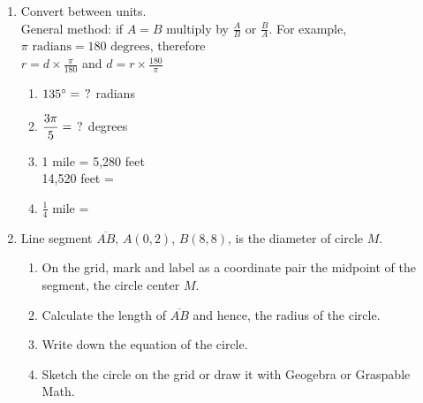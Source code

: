 \documentclass[12pt, twoside]{article}
\begin{document}
\begin{enumerate}
\newpage
\item Convert between units. \\[0.25cm]
General method: if $A = B$ multiply by $\displaystyle \frac{A}{B} \text{ or } \frac{B}{A}$. For example, $\pi \text{ radians}= 180 \text{ degrees}$, therefore \\
$\displaystyle r = d \times \frac{\pi}{180}$ and 
$\displaystyle d = r \times \frac{180}{\pi}$
\vspace{0.5cm}
  \begin{multicols}{2}
  \raggedcolumns
  \begin{enumerate}[itemsep=2cm]
    \item $135^\circ = \hspace{0.15cm} ?$ radians
    \item $\displaystyle \frac{3\pi}{5}  = \hspace{0.15cm} ?$ degrees
    \item 1 mile = 5,280 feet\\[0.5cm]
    14,520 feet = 
    \item $\displaystyle \frac{1}{4}$ mile =   
  \end{enumerate}
  \end{multicols}
    
\newpage
\item Line segment $\overline{AB}$, $A(0,2)$, $B(8,8)$, is the diameter of circle $M$. 
\begin{enumerate}
  \item On the grid, mark and label as a coordinate pair the midpoint of the segment, the circle center $M$. 
  \item Calculate the length of $\overline{AB}$ and hence, the radius of the circle.\
  \item Write down the equation of the circle. 
  \item Sketch the circle on the grid or draw it with Geogebra or Graspable Math.
\end{enumerate}
\begin{flushright}
  \end{flushright}


\end{enumerate}
\end{document}
